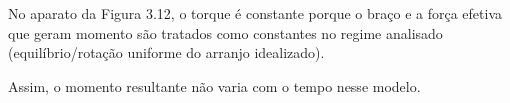 No aparato da Figura 3.12, o torque é constante porque o braço e a força efetiva que geram momento são tratados como constantes no regime analisado (equilíbrio/rotação uniforme do arranjo idealizado).

Assim, o momento resultante não varia com o tempo nesse modelo.

